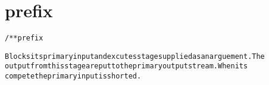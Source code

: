 \section{prefix}
\begin{shaded}
\begin{alltt}
/** prefix

Blocks its primary input and excutes stage supplied as an arguement.  The
output from this stage are put to the primary output stream.  When its
compete the primary input is shorted.

\end{alltt}
\end{shaded}
